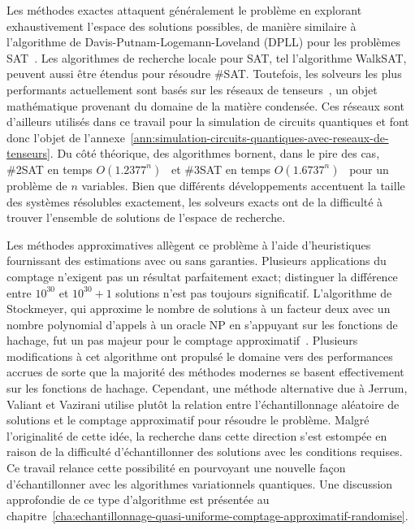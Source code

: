 Les méthodes exactes attaquent généralement le problème en explorant exhaustivement l'espace des solutions possibles, de manière similaire à l'algorithme de Davis-Putnam-Logemann-Loveland (DPLL) pour les problèmes SAT~\cite{davisMachineProgramTheoremproving1962}. Les algorithmes de recherche locale pour SAT, tel l'algorithme WalkSAT, peuvent aussi être étendus pour résoudre \#SAT. Toutefois, les solveurs les plus performants actuellement sont basés sur les réseaux de tenseurs~\cite{kourtisFastCountingTensor2019, dudekEfficientContractionLarge2020, dudekParallelWeightedModel2021}, un objet mathématique provenant du domaine de la matière condensée. Ces réseaux sont d'ailleurs utilisés dans ce travail pour la simulation de circuits quantiques et font donc l'objet de l'annexe~\ref{ann:simulation-circuits-quantiques-avec-reseaux-de-tenseurs}. Du côté théorique, des algorithmes bornent, dans le pire des cas, \#2SAT en temps $O(1.2377^{n})$~\cite{wahlstromTighterBoundCounting2008a} et \#3SAT en temps $O(1.6737^{n})$~\cite{dahllofCountingModels2SAT2005} pour un problème de $n$ variables. Bien que différents développements accentuent la taille des systèmes résolubles exactement, les solveurs exacts ont de la difficulté à trouver l'ensemble de solutions de l'espace de recherche.

Les méthodes approximatives allègent ce problème à l'aide d'heuristiques fournissant des estimations avec ou sans garanties. Plusieurs applications du comptage n'exigent pas un résultat parfaitement exact; distinguer la différence entre $10^{30}$ et $10^{30}+1$ solutions n'est pas toujours significatif. L'algorithme de Stockmeyer, qui approxime le nombre de solutions à un facteur deux avec un nombre polynomial d'appels à un oracle \textsf{NP} en s'appuyant sur les fonctions de hachage, fut un pas majeur pour le comptage approximatif~\cite{stockmeyerComplexityApproximateCounting1983}. Plusieurs modifications à cet algorithme ont propulsé le domaine vers des performances accrues de sorte que la majorité des méthodes modernes se basent effectivement sur les fonctions de hachage. Cependant, une méthode alternative due à Jerrum, Valiant et Vazirani utilise plutôt la relation entre l'échantillonnage aléatoire de solutions et le comptage approximatif pour résoudre le problème. Malgré l'originalité de cette idée, la recherche dans cette direction s'est estompée en raison de la difficulté d'échantillonner des solutions avec les conditions requises. Ce travail relance cette possibilité en pourvoyant une nouvelle façon d'échantillonner avec les algorithmes variationnels quantiques. Une discussion approfondie de ce type d'algorithme est présentée au chapitre~\ref{cha:echantillonnage-quasi-uniforme-comptage-approximatif-randomise}.

